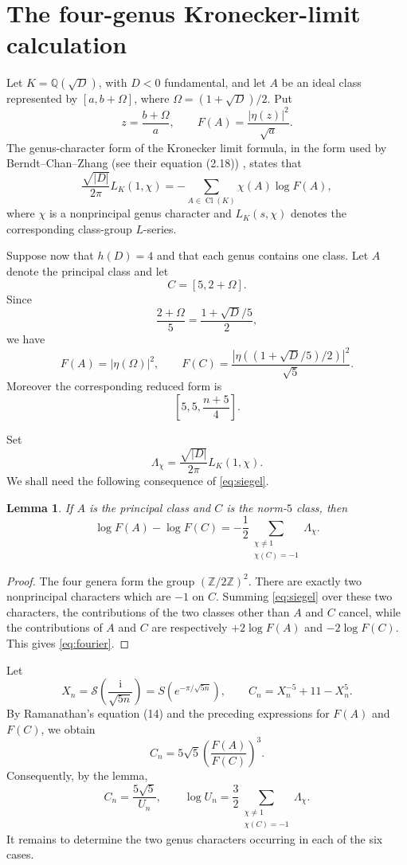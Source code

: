 \documentclass[11pt,a4paper]{article}
\newtheorem{lemma}[theorem]{Lemma}
\newcommand{\ii}{\mathrm i}
\newcommand{\Cl}{\operatorname{Cl}}
\begin{document}
\section{The four-genus Kronecker-limit calculation}
Let $K=\mathbb Q(\sqrt D)$, with $D<0$ fundamental, and let $A$ be an ideal class represented by
$[a,b+\Omega]$, where $\Omega=(1+\sqrt D)/2$.  Put
\[
z=\frac{b+\Omega}{a},
\qquad
F(A)=\frac{|\eta(z)|^2}{\sqrt a}.
\]
The genus-character form of the Kronecker limit formula, in the form used by Berndt--Chan--Zhang (see their equation (2.18)) \cite{BCZ1997}, states that
\begin{equation}
\frac{\sqrt{|D|}}{2\pi}L_K(1,\chi)
=-\sum_{A\in\Cl(K)}\chi(A)\log F(A),
\label{eq:siegel}
\end{equation}
where $\chi$ is a nonprincipal genus character and $L_K(s,\chi)$ denotes the corresponding class-group $L$-series.

Suppose now that $h(D)=4$ and that each genus contains one class.  Let $A$ denote the principal class and let
\[
C=[5,2+\Omega].
\]
Since
\[
\frac{2+\Omega}{5}=\frac{1+\sqrt D/5}{2},
\]
we have
\[
F(A)=|\eta(\Omega)|^2,
\qquad
F(C)=\frac{\left|\eta((1+\sqrt D/5)/2)\right|^2}{\sqrt5}.
\]
Moreover the corresponding reduced form is
\[
\left[5,5,\frac{n+5}{4}\right].
\]

Set
\[
\Lambda_\chi=\frac{\sqrt{|D|}}{2\pi}L_K(1,\chi).
\]
We shall need the following consequence of \eqref{eq:siegel}.

\begin{lemma}
If $A$ is the principal class and $C$ is the norm-$5$ class, then
\begin{equation}
\log F(A)-\log F(C)
=-\frac12\sum_{\substack{\chi\ne1\\ \chi(C)=-1}}\Lambda_\chi.
\label{eq:fourier}
\end{equation}
\end{lemma}

\begin{proof}
The four genera form the group $(\mathbb Z/2\mathbb Z)^2$.  There are exactly two nonprincipal characters which are $-1$ on $C$.  Summing \eqref{eq:siegel} over these two characters, the contributions of the two classes other than $A$ and $C$ cancel, while the contributions of $A$ and $C$ are respectively $+2\log F(A)$ and $-2\log F(C)$.  This gives \eqref{eq:fourier}.
\end{proof}

Let
\[
X_n=\mathcal S\!\left(\frac{\ii}{\sqrt{5n}}\right)=S(e^{-\pi/\sqrt{5n}}),
\qquad
C_n=X_n^{-5}+11-X_n^5.
\]
By Ramanathan's equation (14) \cite[p.~70]{Ramanathan1984} and the preceding expressions for $F(A)$ and $F(C)$, we obtain
\begin{equation}
C_n=5\sqrt5\left(\frac{F(A)}{F(C)}\right)^3.
\label{eq:CF}
\end{equation}
Consequently, by the lemma,
\begin{equation}
C_n=\frac{5\sqrt5}{U_n},
\qquad
\log U_n=\frac32\sum_{\substack{\chi\ne1\\ \chi(C)=-1}}\Lambda_\chi.
\label{eq:Umaster}
\end{equation}
It remains to determine the two genus characters occurring in each of the six cases.
\end{document}
